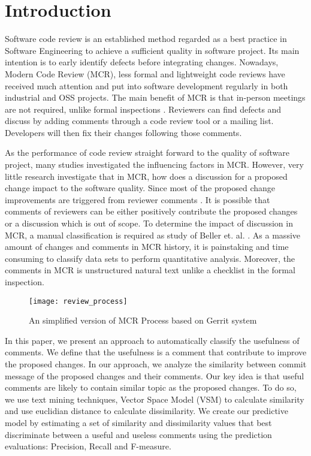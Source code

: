 
\section{Introduction}
Software code review is an established method regarded as a best practice in Software Engineering to achieve a sufficient quality in software project.
Its main intention is to early identify defects before integrating changes.
Nowadays, Modern Code Review (MCR)\cite{Bacchelli2013a}, less formal and lightweight code reviews have received much attention and put into software development regularly in both industrial and OSS projects.
The main benefit of MCR is that in-person meetings are not required, unlike formal inspections \cite{Fagan:1976:DCI:1661010.1661012}.
Reviewers can find defects and discuss by adding comments through a code review tool or a mailing list.
Developers will then fix their changes following those comments.

As the performance of code review straight forward to the quality of software project, many studies investigated the influencing factors in MCR\cite{Baysal2001,Mcintosh,Beller,Hamasaki2013}. However, very little research investigate that in MCR, how does a discussion for a proposed change impact to the software quality. Since most of the proposed change improvements are triggered from reviewer comments \cite{Beller}. 
It is possible that comments of reviewers can be either positively contribute the proposed changes or a discussion which is out of scope.
To determine the impact of discussion in MCR, a manual classification is required as study of Beller et. al. \cite{Beller}. As a massive amount of changes and comments in MCR history\cite{Balachandran2013,Thongtanunam2014}, it is painstaking and time consuming to classify data sets to perform quantitative analysis. Moreover, the comments in MCR is unstructured natural text unlike a checklist in the formal inspection. 
\begin{figure}[!t]
\centering
\texttt{[image: review\_process]}
\caption{An simplified version of MCR Process based on Gerrit system}
\label{fig:process}
\end{figure}

In this paper, we present an approach to automatically classify the usefulness of comments. We define that the usefulness is a comment that contribute to improve the proposed changes. In our approach, we analyze the similarity between commit message of the proposed changes and their comments. Our key idea is that useful comments are likely to contain similar topic as the proposed changes. To do so, we use text mining techniques, Vector Space Model (VSM) to calculate similarity and use euclidian distance to calculate dissimilarity. 
We create our predictive model by estimating a set of similarity and dissimilarity values that best discriminate between a useful and useless comments using the prediction evaluations: Precision, Recall and F-measure.

